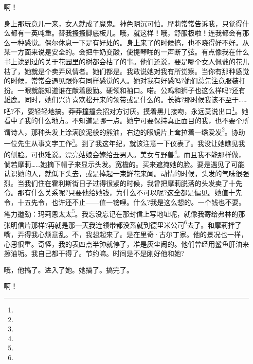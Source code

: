 \par 啊！
\par 身上那玩意儿一来，女人就成了魔鬼。神色阴沉可怕。摩莉常常告诉我，只觉得什么都有一英吨重。替我搔搔脚底板儿。哦，就这样！哦，舒服极啦！连我都会有那么一种感觉。偶尔休息一下是有好处的。身上来了的时候搞，也不晓得好不好。从某一方面来说是安全的。会把牛奶变酸，使提琴啪的一声断了弦。有点像我在什么书上读到过的关于花园里的树都会枯了的事。他们还说，要是哪个女人佩戴的花儿枯了，她就是个卖弄风情者。她们都是。我敢说她对我有所觉察。当你有那种感觉的时候，常常会遇见跟你有同样感觉的人。她对我有好感吗?她们总先注意服装打扮。一眼就能知道谁在献着殷勤。硬领和袖口。喏。公鸡和狮子也这么样吗?还有雄鹿。同时，她们兴许喜欢松开来的领带或是什么的。长裤?那时候我该不至于……吧?不，要轻轻地搞。莽莽撞撞会招对方讨厌。摸着黑儿接吻，永远莫说出口\footnote{}。她看中了我的什么地方。不知道是哪一点。她宁可要保持真正面目的我，也不要个所谓诗人，那种头发上涂满胶泥般的熊油，右边的眼镜片上耷拉着一绺爱发\footnote{}。协助一位先生从事文字工作\footnote{}。到了我这年纪，就该注意一下仪表了。我没让她瞧见我的侧脸。可也难说。漂亮姑娘会嫁给丑男人。美女与野兽\footnote{}。而且我不能那样做，倘若摩莉……她摘下帽子来显示头发。宽檐的。买来遮掩她的脸。要是遇见了可能认识她的人，就低下头去，或是捧起一束鲜花来闻。动情的时候，头发的气味很强烈。当我们住在霍利斯街日子过得很紧的时候，我曾把摩莉脱落的头发卖了十先令。那有什么关系呢?只要他给她钱，为什么不可以呢?这全都是偏见。她值十先令，十五先令，也许还不止——值一镑哩。什么?我是这么想的。一个钱也不要。笔力遒劲：玛莉恩太太\footnote{}。我忘没忘记在那封信上写地址呢，就像我寄给弗林的那张明信片那样?再就是那一天我连领带都没系就到德里米公司\footnote{}去了。和摩莉拌了嘴，弄得我心烦意乱。不，我想起来了。是在里奇·古尔丁家。他的景况也一样，心思很重。奇怪，我的表四点半钟就停了，准是灰尘闹的。他们曾经用鲨鱼肝油来擦油垢。我自己都干得了。节约嘛。时间是不是刚好他和她?
\par 哦，他搞了。进入了她。她搞了。搞完了。
\par 啊！
